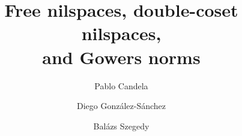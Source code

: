 \documentclass[a4paper,12pt,reqno]{amsart}
\theoremstyle{definition}
\begin{document}
\singlespacing

\vspace*{-1cm}

\title[Free nilspaces, double-coset nilspaces, and Gowers norms]{Free nilspaces, double-coset nilspaces,\\ and Gowers norms}

\author{Pablo Candela}
\address{Universidad Aut\'onoma de Madrid and ICMAT\\ Ciudad Universitaria de Cantoblanco\\ Madrid 28049\\ Spain}

\author{Diego Gonz\'alez-S\'anchez}
\address{MTA Alfr\'ed R\'enyi Institute of Mathematics\\ 
Re\'altanoda utca 13-15\\
Budapest, Hungary, H-1053}

\author{Bal\'azs Szegedy}
\address{MTA Alfr\'ed R\'enyi Institute of Mathematics\\ 
Re\'altanoda utca 13-15\\
Budapest, Hungary, H-1053}
\maketitle
\end{document}
